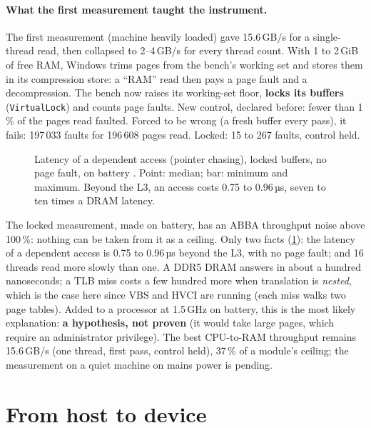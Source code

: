 \paragraph{What the first measurement taught the instrument.} The first measurement (machine heavily loaded) gave 15.6\,GB/s for a single-thread read, then collapsed to 2--4\,GB/s for every thread count. With 1 to 2\,GiB of free RAM, Windows trims pages from the bench's working set and stores them in its compression store: a \enquote{RAM} read then pays a page fault and a decompression. The bench now raises its working-set floor, \textbf{locks its buffers} (\texttt{VirtualLock}) and counts page faults. New control, declared before: fewer than 1\,\% of the pages read faulted. Forced to be wrong (a fresh buffer every pass), it fails: 197\,033 faults for 196\,608 pages read. Locked: 15 to 267 faults, control held.

\begin{figure}[ht]
\centering
\GrapheLatence
\caption[Dependent-access latency versus buffer size]{Latency of a dependent access (pointer chasing), locked buffers, no page fault, on battery \mes. Point: median; bar: minimum and maximum. Beyond the L3, an access costs 0.75 to 0.96\,µs, seven to ten times a DRAM latency.}
\label{fig:latence}
\end{figure}

The locked measurement, made on battery, has an ABBA throughput noise above 100\,\%: nothing can be taken from it as a ceiling. Only two facts (\cref{fig:latence}): the latency of a dependent access is 0.75 to 0.96\,µs beyond the L3, with no page fault; and 16 threads read more slowly than one. A DDR5 DRAM answers in about a hundred nanoseconds; a TLB miss costs a few hundred more when translation is \emph{nested}, which is the case here since VBS and HVCI are running (each miss walks two page tables). Added to a processor at 1.5\,GHz on battery, this is the most likely explanation: \textbf{a hypothesis, not proven} (it would take large pages, which require an administrator privilege). The best CPU-to-RAM throughput remains 15.6\,GB/s (one thread, first pass, control held), 37\,\% of a module's ceiling; the measurement on a quiet machine on mains power is pending.

\section{From host to device}\label{sec:pcie}

